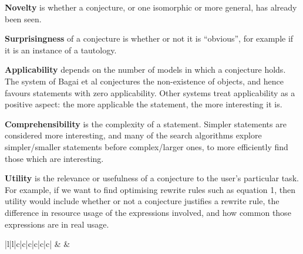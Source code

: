 {\bf Novelty} is whether a conjecture, or one isomorphic or more
general, has already been seen.

{\bf Surprisingness} of a conjecture is whether or not it is
``obvious'', for example if it is an instance of a tautology.

{\bf Applicability} depends on the number of models in which a
conjecture holds. The system of Bagai et al conjectures the
non-existence of objects, and hence favours statements with zero
applicability. Other systems treat applicability as a positive
aspect: the more applicable the statement, the more interesting it is.

{\bf Comprehensibility} is the complexity of a statement. Simpler
statements are considered more interesting, and many of the search
algorithms explore simpler/smaller statements before complex/larger
ones, to more efficiently find those which are interesting.

{\bf Utility} is the relevance or usefulness of a conjecture to the
user's particular task. For example, if we want to find optimising
rewrite rules such as equation 1, then utility would include whether
or not a conjecture justifies a rewrite rule, the difference in
resource usage of the expressions involved, and how common those
expressions are in real usage.


\begin{table}
  \centering
  \begin{tabular}{ |l|l|c|c|c|c|c|c| }
    \hline
                         &
                &
     \\ \hhline{~~------}
    \tRow{            &                    & \iE & \iN & \iS & \iA & \iC & \iU}
  \end{tabular}
  \caption{Classification of ATE systems from \cite{colton2000notion}, extended
    to those compared in \cite{claessen2013automating} (QuickSpec is the
    conjecture generation component of HipSpec). The interestingness measures
    are \iE{}mpirical plausibility, \iN{}ovelty, \iS{}urprisingness,
    \iA{}pplicability, \iC{}omprehensibility (low complexity) and \iU{}tility.}
  \label{table:colton}
\end{table}

